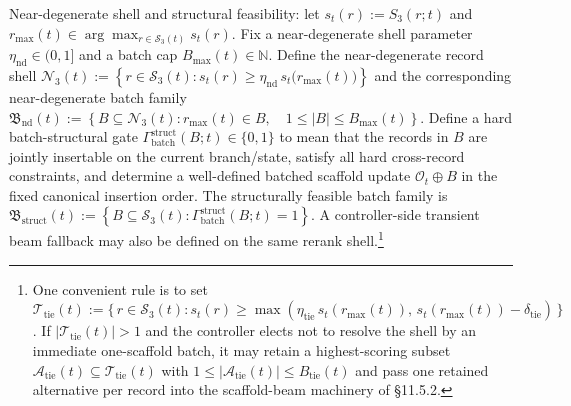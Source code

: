 \documentclass[11pt]{article}
\begin{document}
Near-degenerate shell and structural feasibility: let \(s_t(r):=S_3(r;t)\) and \(r_{\max}(t)\in \arg\max_{r\in \mathcal S_3(t)} s_t(r)\). Fix a near-degenerate shell parameter \(\eta_{\mathrm{nd}}\in(0,1]\) and a batch cap \(B_{\max}(t)\in\mathbb N\). Define the near-degenerate record shell \(\mathcal N_3(t):=\left\{ r\in \mathcal S_3(t): s_t(r)\ge \eta_{\mathrm{nd}}\,s_t\!\bigl(r_{\max}(t)\bigr) \right\}\) and the corresponding near-degenerate batch family \(\mathfrak B_{\mathrm{nd}}(t):=\left\{ B\subseteq \mathcal N_3(t): r_{\max}(t)\in B,\quad 1\le |B|\le B_{\max}(t) \right\}\). Define a hard batch-structural gate \(\Gamma_{\mathrm{batch}}^{\mathrm{struct}}(B;t)\in\{0,1\}\) to mean that the records in \(B\) are jointly insertable on the current branch/state, satisfy all hard cross-record constraints, and determine a well-defined batched scaffold update \(\mathcal O_t\oplus B\) in the fixed canonical insertion order. The structurally feasible batch family is \(\mathfrak B_{\mathrm{struct}}(t):=\left\{ B\subseteq \mathcal S_3(t): \Gamma_{\mathrm{batch}}^{\mathrm{struct}}(B;t)=1 \right\}\). A controller-side transient beam fallback may also be defined on the same rerank shell.\footnote{One convenient rule is to set \(\mathcal T_{\mathrm{tie}}(t):=\{\,r\in\mathcal S_3(t): s_t(r)\ge \max(\eta_{\mathrm{tie}}\,s_t(r_{\max}(t)),\,s_t(r_{\max}(t))-\delta_{\mathrm{tie}})\,\}\). If \(|\mathcal T_{\mathrm{tie}}(t)|>1\) and the controller elects not to resolve the shell by an immediate one-scaffold batch, it may retain a highest-scoring subset \(\mathcal A_{\mathrm{tie}}(t)\subseteq \mathcal T_{\mathrm{tie}}(t)\) with \(1\le |\mathcal A_{\mathrm{tie}}(t)|\le B_{\mathrm{tie}}(t)\) and pass one retained alternative per record into the scaffold-beam machinery of \S 11.5.2.}
\end{document}
